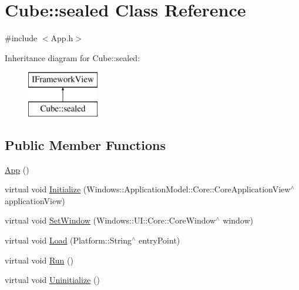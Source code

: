 \hypertarget{class_cube_1_1sealed}{}\section{Cube\+:\+:sealed Class Reference}
\label{class_cube_1_1sealed}


{\ttfamily \#include $<$App.\+h$>$}

Inheritance diagram for Cube\+:\+:sealed\+:\begin{figure}[H]
\begin{center}
\leavevmode
\includegraphics[height=2.000000cm]{class_cube_1_1sealed}
\end{center}
\end{figure}
\subsection*{Public Member Functions}
\begin{DoxyCompactItemize}
\item 
\hyperlink{class_cube_1_1sealed_a2921e740241bae7484e2682f90749b4f}{App} ()
\item 
virtual void \hyperlink{class_cube_1_1sealed_a9558710bf2600718f1ff7cbbcaa6213e}{Initialize} (Windows\+::\+Application\+Model\+::\+Core\+::\+Core\+Application\+View$^\wedge$ application\+View)
\item 
virtual void \hyperlink{class_cube_1_1sealed_aa548d90b484cc7e465459cf6a0635c6e}{Set\+Window} (Windows\+::\+U\+I\+::\+Core\+::\+Core\+Window$^\wedge$ window)
\item 
virtual void \hyperlink{class_cube_1_1sealed_a6b0578eb7635f4beda03ff766bf2b043}{Load} (Platform\+::\+String$^\wedge$ entry\+Point)
\item 
virtual void \hyperlink{class_cube_1_1sealed_a08467aa423e2a57ac7d9fd46f1b8e4ed}{Run} ()
\item 
virtual void \hyperlink{class_cube_1_1sealed_ad8675c3ad9633b9220384db60c6c2d15}{Uninitialize} ()
\end{DoxyCompactItemize}
